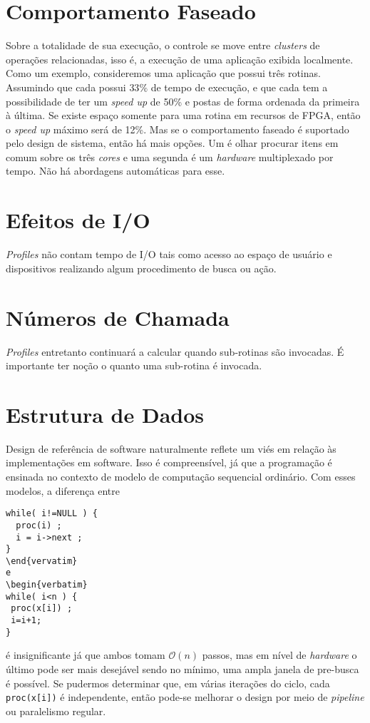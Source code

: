 \section{Comportamento Faseado}
Sobre a totalidade de sua execução, o controle se move entre \textit{clusters} de operações relacionadas, isso é, a execução de uma aplicação exibida localmente. Como um exemplo, consideremos uma aplicação que possui três rotinas. Assumindo que cada possui $ 33\% $ de tempo de execução, e que cada tem a possibilidade de ter um \textit{speed up} de 50\% e postas de forma ordenada da primeira à última. Se existe espaço somente para uma rotina em recursos de FPGA, então o \textit{speed up} máximo será de 12\%. Mas se o comportamento faseado é suportado pelo design de sistema, então há mais opções. Um é olhar procurar itens em comum sobre os três \textit{cores} e uma segunda é um \textit{hardware} multiplexado por tempo. Não há abordagens automáticas para esse.

\section{Efeitos de I/O}
\textit{Profiles} não contam tempo de I/O tais como acesso ao espaço de usuário e dispositivos realizando algum procedimento de busca ou ação.

\section{Números de Chamada}
\textit{Profiles} entretanto continuará a calcular quando sub-rotinas são invocadas. É importante ter noção o quanto uma sub-rotina é invocada.

\section{Estrutura de Dados}
Design de referência de software naturalmente reflete um viés em relação às implementações em software. Isso é compreensível, já que a programação é ensinada no contexto de modelo de computação sequencial ordinário. Com esses modelos, a diferença entre 
\begin{verbatim}
while( i!=NULL ) {
  proc(i) ;
  i = i->next ;
} 
\end{vervatim}
e 
\begin{verbatim}
while( i<n ) {
 proc(x[i]) ;
 i=i+1;
}
\end{verbatim}
é insignificante já que ambos tomam $ \mathcal{O}(n) $ passos, mas em nível de \textit{hardware} o último pode ser mais desejável sendo no mínimo, uma ampla janela de pre-busca é possível. Se pudermos determinar que, em várias iterações do ciclo, cada \texttt{proc(x[i])} é independente, então pode-se melhorar o design por meio de \textit{pipeline} ou paralelismo regular.

